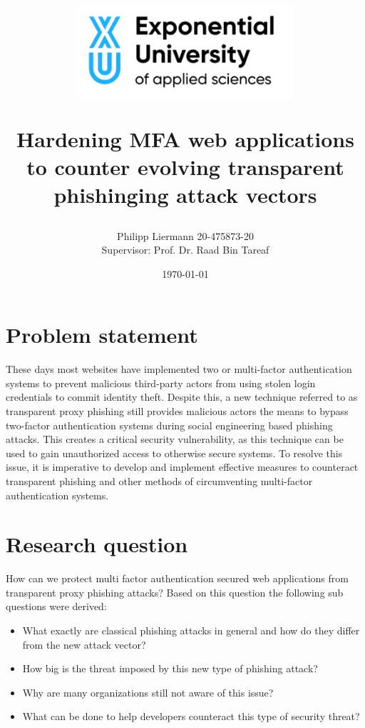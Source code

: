 \documentclass[12pt]{report}
\begin{document}
\author{Philipp Liermann 20-475873-20\\Supervisor: Prof. Dr. Raad Bin Tareaf}
\date{\today}

\title{
\begin{center}
	\includegraphics[width=8cm]{./images/logo.png}
\end{center}
\vspace{2cm}
Hardening MFA web applications to counter evolving transparent phishinging attack
vectors
\vspace{2cm}
\large }

\maketitle

\newpage
\tableofcontents

\newpage
\section{Problem statement}
These days most websites have implemented two or multi-factor authentication systems
to prevent malicious third-party actors from using stolen login credentials to
commit identity theft. Despite this, a new technique referred to as transparent
proxy phishing still provides malicious actors the means to bypass two-factor authentication
systems during social engineering based phishing attacks. This creates a
critical security vulnerability, as this technique can be used to gain unauthorized
access to otherwise secure systems. To resolve this issue, it is imperative to
develop and implement effective measures to counteract transparent phishing and
other methods of circumventing multi-factor authentication systems.

\section{Research question}
How can we protect multi factor authentication secured web applications from transparent
proxy phishing attacks? Based on this question the following sub questions
were derived:
\begin{itemize}
	\item What exactly are classical phishing attacks in general and how do they
	      differ from the new attack vector?

	\item How big is the threat imposed by this new type of phishing attack?

	\item Why are many organizations still not aware of this issue?

	\item What can be done to help developers counteract this type of security threat?
\end{itemize}
\end{document}
